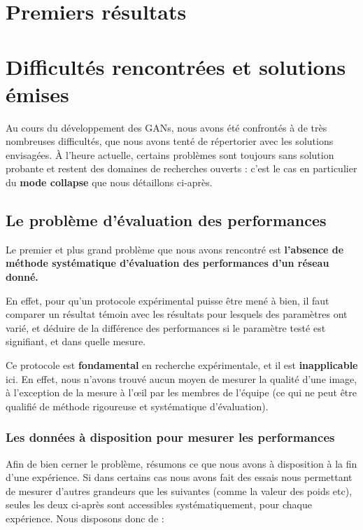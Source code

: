 \section{Premiers résultats}

\section{Difficultés rencontrées et solutions émises}

Au cours du développement des GANs, nous avons été confrontés à de très nombreuses difficultés, que nous avons tenté de répertorier avec les solutions envisagées. À l'heure actuelle, certains problèmes sont toujours sans solution probante et restent des domaines de recherches ouverts : c'est le cas en particulier du \textbf{mode collapse} que nous détaillons ci-après.

\subsection{Le problème d'évaluation des performances}

Le premier et plus grand problème que nous avons rencontré est \textbf{l'absence de méthode systématique d'évaluation des performances d'un réseau donné.}

En effet, pour qu'un protocole expérimental puisse être mené à bien, il faut comparer un résultat témoin avec les résultats pour lesquels des paramètres ont varié, et déduire de la différence des performances si le paramètre testé est signifiant, et dans quelle mesure.

Ce protocole est \textbf{fondamental} en recherche expérimentale, et il est \textbf{inapplicable} ici. En effet, nous n'avons trouvé aucun moyen de mesurer la qualité d'une image, à l'exception de la mesure à l’œil par les membres de l'équipe (ce qui ne peut être qualifié de méthode rigoureuse et systématique d'évaluation). 

\subsubsection{Les données à disposition pour mesurer les performances}

Afin de bien cerner le problème, résumons ce que nous avons à disposition à la fin d'une expérience. Si dans certains cas nous avons fait des essais nous permettant de mesurer d'autres grandeurs que les suivantes (comme la valeur des poids etc), seules les deux ci-après sont accessibles systématiquement, pour chaque expérience.
Nous disposons donc de :

